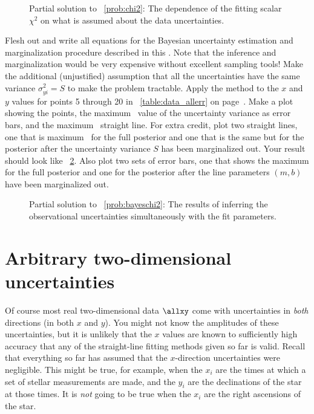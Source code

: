 \documentclass[12pt,twoside,pdftex]{article}
\begin{document}
\begin{figure}[htbp]
\caption{Partial solution to \problemname~\ref{prob:chi2}: The
dependence of the fitting scalar $\chi^2$ on what is assumed about the
data uncertainties.}\label{fig:chi2}
\end{figure}

\begin{problem}\label{prob:bayeschi2}
Flesh out and write all equations for the Bayesian uncertainty
estimation and marginalization procedure described in this
\sectionname.  Note that the inference and marginalization would be
very expensive without excellent sampling tools!  Make the additional
(unjustified) assumption that all the uncertainties have the same
variance $\sigma_{yi}^2=S$ to make the problem tractable.  Apply the
method to the $x$ and $y$ values for points 5 through 20 in
\tablename~\ref{table:data_allerr} on
page~\pageref{table:data_allerr}.  Make a plot showing the points, the
maximum \aposteriori\ value of the uncertainty variance as error bars,
and the maximum \aposteriori\ straight line.  For extra credit, plot
two straight lines, one that is maximum \aposteriori\ for the full
posterior and one that is the same but for the posterior after the
uncertainty variance $S$ has been marginalized out.  Your result
should look like \figurename~\ref{fig:bayeschi2}.  Also plot two
sets of error bars, one that shows the maximum for the full posterior
and one for the posterior after the line parameters $(m,b)$ have been
marginalized out.
\end{problem}

\begin{figure}[htbp]
\caption{Partial solution to \problemname~\ref{prob:bayeschi2}: The
results of inferring the observational uncertainties simultaneously
with the fit parameters.}\label{fig:bayeschi2}
\end{figure}

\section{Arbitrary two-dimensional uncertainties}\label{sec:twod}

Of course most real two-dimensional data $\allxy$ come with
uncertainties in \emph{both} directions (in both $x$ and $y$).  You
might not know the amplitudes of these uncertainties, but it is
unlikely that the $x$ values are known to sufficiently high accuracy
that any of the straight-line fitting methods given so far is valid.
Recall that everything so far has assumed that the $x$-direction
uncertainties were negligible.  This might be true, for example, when
the $x_i$ are the times at which a set of stellar measurements are
made, and the $y_i$ are the declinations of the star at those times.
It is \emph{not} going to be true when the $x_i$ are the right
ascensions of the star.
\end{document}
